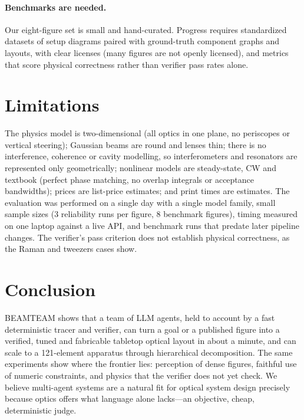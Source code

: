 \documentclass[10pt,twocolumn,letterpaper]{article}
\begin{document}
\paragraph{Benchmarks are needed.} Our eight-figure set is small and hand-curated. Progress requires standardized datasets of setup diagrams paired with ground-truth component graphs and layouts, with clear licenses (many figures are not openly licensed), and metrics that score physical correctness rather than verifier pass rates alone.

\section{Limitations}
\label{sec:limitations}
The physics model is two-dimensional (all optics in one plane, no periscopes or vertical steering); Gaussian beams are round and lenses thin; there is no interference, coherence or cavity modelling, so interferometers and resonators are represented only geometrically; nonlinear models are steady-state, CW and textbook (perfect phase matching, no overlap integrals or acceptance bandwidths); prices are list-price estimates; and print times are estimates. The evaluation was performed on a single day with a single model family, small sample sizes (3 reliability runs per figure, 8 benchmark figures), timing measured on one laptop against a live API, and benchmark runs that predate later pipeline changes. The verifier's pass criterion does not establish physical correctness, as the Raman and tweezers cases show.

\section{Conclusion}
BEAMTEAM shows that a team of LLM agents, held to account by a fast deterministic tracer and verifier, can turn a goal or a published figure into a verified, tuned and fabricable tabletop optical layout in about a minute, and can scale to a 121-element apparatus through hierarchical decomposition. The same experiments show where the frontier lies: perception of dense figures, faithful use of numeric constraints, and physics that the verifier does not yet check. We believe multi-agent systems are a natural fit for optical system design precisely because optics offers what language alone lacks---an objective, cheap, deterministic judge.
\end{document}
